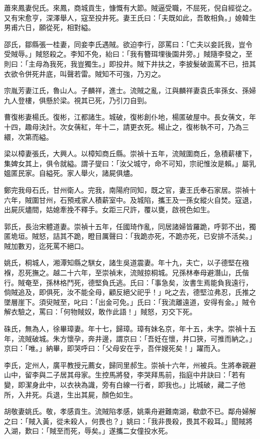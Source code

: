 \begin{pinyinscope}
蕭來鳳妻倪氏。來鳳，商城貢生，慷慨有大節。賊逼受職，不屈死，倪自經從之。又有宋愈亨，深澤舉人，寇至投井死。妻王氏曰：「夫既如此，吾敢相負。」媳韓生男甫六日，願從死，相對縊。

邵氏，鄒縣張一桂妻，同妾李氏遇賊。欲迫李行，邵罵曰：「亡夫以妾託我，豈令受賊辱。」賊怒殺之。李知不免，紿曰：「我有簪珥埋後園井旁。」賊隨李發之，至則曰：「主母為我死，我豈獨生。」即投井。賊下井扶之，李披髮破面罵不已，扭其衣欲令併死井底，叫聲若雷。賊知不可強，乃刃之。

宗胤芳妻江氏，魯山人。子麟祥，進士。流賊之亂，江與麟祥妻袁氏率孫女、孫婦九人登樓，俱懸於梁。視其已死，乃引刀自剄。

曹復彬妻楊氏。復彬，江都諸生。城破，復彬創仆地，楊匿破屋中。長女蒨文，年十四，趣母決計。次女蒨紅，年十二，請更衣死。楊止之，復彬執不可，乃為三繯，次第而縊。

梁以樟妻張氏，大興人。以樟知商丘縣。崇禎十五年，流賊圍商丘，急積薪樓下，集婢女其上，俱令就縊。謂子燮曰：「汝父城守，命不可知，宗祀惟汝是賴。」屬乳媼匿民家。自縊死。家人舉火，諸屍俱燼。

鄭完我母石氏，甘州衛人。完我，南陽府同知，既之官，妻王氏奉石家居。崇禎十六年，賊圍甘州，石預戒家人積薪室中。及城陷，攜王及一孫女縱火自焚。寇退，出屍灰燼間，姑媳牽挽不釋手。女距三尺許，覆以甕，啟視色如生。

郭氏，長治宋體道妻。崇禎十五年，任國琦作亂，同居諸婦皆羅跪，呼郭不出，獨匿垝垣。賊怒，詰其不跪，瞪目厲聲曰：「我跪亦死，不跪亦死，已安排不活矣。」賊加數刃，迄死罵不絕口。

姚氏，桐城人，湘潭知縣之騏女，諸生吳道震妻。年十九，夫亡，以子德堅在襁褓，忍死撫之。越二十六年，至崇禎末，流賊掠桐城。兄孫林奉母避潛山，氏偕行。賊奄至，孫林格鬥死，德堅負氏逃。氏曰：「事急矣，汝書生焉能負我遠行，倘賊追及，即俱死，汝不能全母，顧反絕父祀乎！」叱之去，德堅泣弗忍，氏推之墜層崖下。須臾賊至，叱曰：「出金可免。」氏曰：「我流離遠道，安得有金。」賊令解衣驗之，罵曰：「何物賊奴，敢作此語！」賊怒，刃交下死。

硃氏，無為人，徐畢璋妻。年十七，歸璋。璋有妹名京，年十五，未字。崇禎十五年，流賊破城。朱方懷孕，奔井邊，謂京曰：「吾妊在懷，井口狹，可推而納之。」京曰：「唯。」納畢，即哭呼曰：「父母安在乎，吾伴嫂死矣！」躍而入。

李氏，定州人，廣平教授元薦女，歸同里郝生。崇禎十六年，州被兵。生將奉親避山中，留李與二子居其母家。生控馬將發，李哭拜馬前，指庭中井訣曰：「若有變，即潔身此中，以衣袂為識，旁有白線一行者，即我也。」比城破，藏二子他所，入井死。兵退，生出其屍，顏色如生。

胡敬妻姚氏。敬，孝感貢生。流賊陷孝感，姚乘舟避難南湖，欷歔不已。鄰舟婦解之曰：「賊入黃，從未殺人，何畏也？」姚曰：「我非畏殺，畏其不殺耳。」聞賊將入湖，歎曰：「賊至而死，辱矣。」遂攜二女僮投水死。


\end{pinyinscope}
